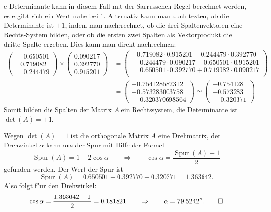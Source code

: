 \begin{loesung}
\begin{teilaufgaben}
e Determinante kann in diesem Fall mit der Sarrusschen Regel
berechnet werden, es ergibt sich ein Wert nahe bei 1.
Alternativ kann man auch testen, ob die Determinante ist $+1$,
indem man nachrrechnet, ob die drei Spaltenvektoren eine
Rechts-System bilden, oder ob die ersten zwei Spalten als Vektorprodukt
die dritte Spalte ergeben. Dies kann man direkt nachrechnen:
\begin{align*}
\begin{pmatrix}
\phantom{-}0.650501\\
  -0.719082\\
\phantom{-}0.244479
\end{pmatrix}
\times
\begin{pmatrix}
0.090217\\
0.392770\\
0.915201
\end{pmatrix}
&=
\begin{pmatrix}
-0.719082\cdot 0.915201 - 0.244479\cdot 0.392770\\
\phantom{-}0.244479\cdot 0.090217 - 0.650501\cdot 0.915201\\
\phantom{-}0.650501\cdot 0.392770 + 0.719082\cdot 0.090217\\
\end{pmatrix}
\\
&=
\begin{pmatrix}
%
-0.754128582312\\
-0.573283003758\\
\phantom{-}0.320370698564
\end{pmatrix}
\simeq
\begin{pmatrix}
-0.754128\\
-0.573283\\
\phantom{-}0.320371
\end{pmatrix}
\end{align*}
Somit bilden die Spalten der Matrix $A$ ein Rechtssystem, die Determinante
ist $\det(A)=+1$.
\item Wegen $\det(A)=1$ ist die orthogonale Matrix $A$ eine Drehmatrix,
der Drehwinkel $\alpha$ kann aus der Spur mit Hilfe der Formel
\[
\operatorname{Spur}(A)=1+2\cos\alpha\qquad\Rightarrow\qquad
\cos\alpha=\frac{\operatorname{Spur}(A)-1}2
\]
gefunden werden. Der Wert der Spur ist
\[
\operatorname{Spur}(A) = 0.650501  + 0.392770  + 0.320371 = 1.363642.
\]
Also folgt f"ur den Drehwinkel:
\[
\cos\alpha=\frac{1.363642-1}2= 0.181821\qquad\Rightarrow\qquad
\alpha=79.5242^\circ.
\qedhere
\]
\end{teilaufgaben}
\end{loesung}

